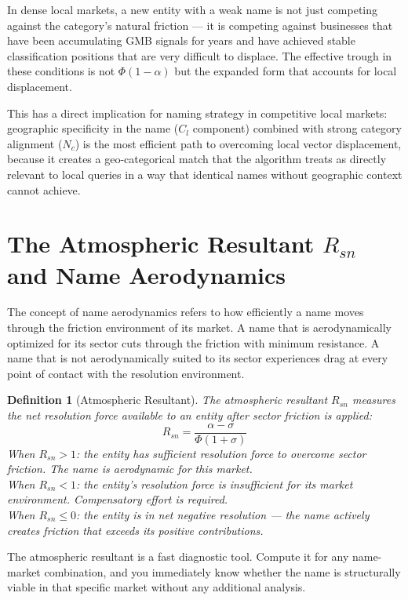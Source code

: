 \documentclass[12pt, openany]{book}
\theoremstyle{thmstyle}
\theoremstyle{defstyle}
\newtheorem{definition}{Definition}[chapter]
\newcommand{\Nc}{N_c}
\newcommand{\Cl}{C_l}
\begin{document}
In dense local markets, a new entity with a weak name is not just competing against the category's natural friction --- it is competing against businesses that have been accumulating GMB signals for years and have achieved stable classification positions that are very difficult to displace. The effective trough in these conditions is not $\Phi(1-\alpha)$ but the expanded form that accounts for local displacement.

This has a direct implication for naming strategy in competitive local markets: geographic specificity in the name ($\Cl$ component) combined with strong category alignment ($\Nc$) is the most efficient path to overcoming local vector displacement, because it creates a geo-categorical match that the algorithm treats as directly relevant to local queries in a way that identical names without geographic context cannot achieve.

\section{The Atmospheric Resultant $R_{sn}$ and Name Aerodynamics}

The concept of name aerodynamics refers to how efficiently a name moves through the friction environment of its market. A name that is aerodynamically optimized for its sector cuts through the friction with minimum resistance. A name that is not aerodynamically suited to its sector experiences drag at every point of contact with the resolution environment.

\begin{definition}[Atmospheric Resultant]
The atmospheric resultant $R_{sn}$ measures the net resolution force available to an entity after sector friction is applied:
\[
R_{sn} = \frac{\alpha - \sigma}{\Phi(1+\sigma)}
\]
When $R_{sn} > 1$: the entity has sufficient resolution force to overcome sector friction. The name is aerodynamic for this market.\\
When $R_{sn} < 1$: the entity's resolution force is insufficient for its market environment. Compensatory effort is required.\\
When $R_{sn} \leq 0$: the entity is in net negative resolution --- the name actively creates friction that exceeds its positive contributions.
\end{definition}

The atmospheric resultant is a fast diagnostic tool. Compute it for any name-market combination, and you immediately know whether the name is structurally viable in that specific market without any additional analysis.
\end{document}
